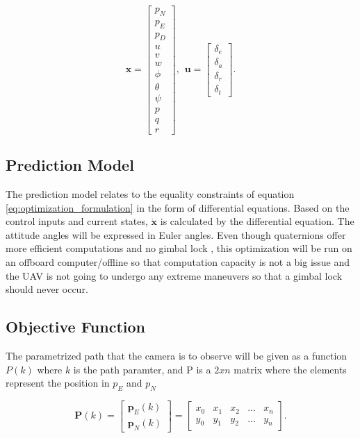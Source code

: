 \begin{equation}
	\mathbf{x} =
	\begin{bmatrix}
		p_N \\ p_E \\ p_D \\
		u \\ v \\ w \\
		\phi \\ \theta \\ \psi \\
		p \\ q \\ r
	\end{bmatrix}
	, \hspace{5pt} \mathbf{u} =
	\begin{bmatrix}
		\delta_e \\ \delta_a \\ \delta_r \\ \delta_t
	\end{bmatrix}.
\end{equation}


\subsection{Prediction Model}

The prediction model relates to the equality constraints of equation \ref{eq:optimization_formulation} in the form of differential equations. Based on the control inputs and current states, $\mathbf{\dot{x}}$ is calculated by the differential equation. The attitude angles will be expressed in Euler angles. Even though quaternions offer more efficient computations and no gimbal lock \cite{uavBEARD}, this optimization will be run on an offboard computer/offline so that computation capacity is not a big issue and the UAV is not going to undergo any extreme maneuvers so that a gimbal lock should never occur.


\subsection{Objective Function}

The parametrized path that the camera is to observe will be given as a function $P(k)$ where $k$ is the path paramter, and P is a $2xn$ matrix where the elements represent the position in $p_E$ and $p_N$

\begin{equation}
	\mathbf{P}(k) = 
	\begin{bmatrix}
		\mathbf{p}_E(k) \\ \mathbf{p}_N(k)
	\end{bmatrix}
	=
	\begin{bmatrix}
		x_0 & x_1 & x_2 & \hdots & x_n \\
		y_0 & y_1 & y_2 & \hdots & y_n
	\end{bmatrix}.
\end{equation}


